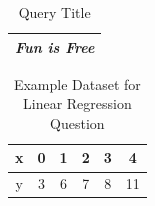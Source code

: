\documentclass[--SOLUTION-OPTION--]{ditpaper}
\begin{document}
\begin{table}[h]
\caption{Query Title}
\centering
\begin{tabular}{l}
\hline
\textit{Fun is Free}\\
\hline
\end{tabular}
\label{tab:spamhamquery}
\end{table}



\newpage


\begin{table}
\begin{center}
\begin{tabular}{cccccc}
\hline
x & 0 & 1 & 2 & 3 & 4\\
\hline
y & 3 & 6 & 7 & 8 & 11\\
\hline
\end{tabular}
\caption{Example Dataset for Linear Regression Question}
\label{tab:linregTab2}
\end{center}
\end{table}
\end{document}
